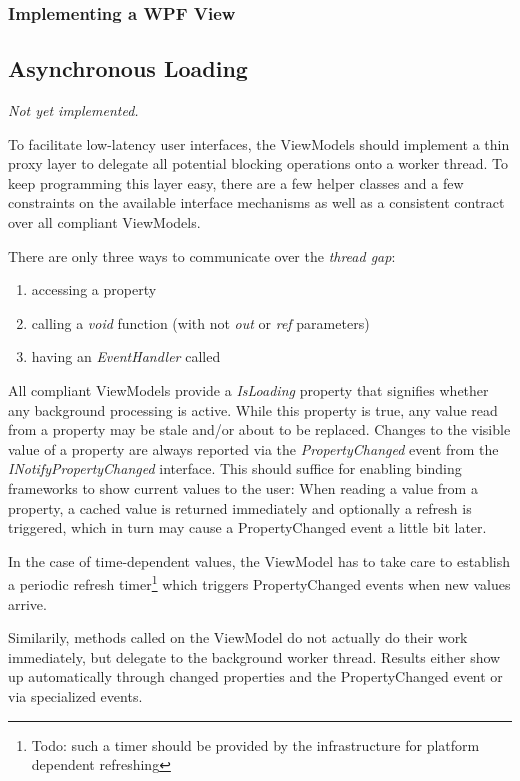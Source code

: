 \subsubsection{Implementing a WPF View}

\subsection{Asynchronous Loading}

\emph{Not yet implemented.}

To facilitate low-latency user interfaces, the ViewModels should implement a
thin proxy layer to delegate all potential blocking operations onto a worker
thread. To keep programming this layer easy, there are a few helper classes and
a few constraints on the available interface mechanisms as well as a consistent
contract over all compliant ViewModels.

There are only three ways to communicate over the \emph{thread gap}:
\begin{enumerate}
\item{accessing a property}
\item{calling a \emph{void} function (with not \emph{out} or \emph{ref} parameters)}
\item{having an \emph{EventHandler} called}
\end{enumerate}

All compliant ViewModels provide a \emph{IsLoading} property that signifies
whether any background processing is active. While this property is true, any
value read from a property may be stale and/or about to be replaced. Changes to
the visible value of a property are always reported via the
\emph{PropertyChanged} event from the \emph{INotifyPropertyChanged} interface.
This should suffice for enabling binding frameworks to show current values to
the user: When reading a value from a property, a cached value is returned
immediately and optionally a refresh is triggered, which in turn may cause a
PropertyChanged event a little bit later.

In the case of time-dependent values, the ViewModel has to take care
to establish a periodic refresh timer\footnote{Todo: such a timer should be
provided by the infrastructure for platform dependent refreshing} which
triggers PropertyChanged events when new values arrive.

Similarily, methods called on the ViewModel do not actually do their work
immediately, but delegate to the background worker thread. Results either show
up automatically through changed properties and the PropertyChanged event or
via specialized events.

